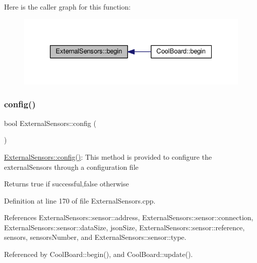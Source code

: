 Here is the caller graph for this function\+:\nopagebreak
\begin{figure}[H]
\begin{center}
\leavevmode
\includegraphics[width=326pt]{classExternalSensors_a58ede0d786a86417254708870f04a21e_icgraph}
\end{center}
\end{figure}
\mbox{\label{classExternalSensors_a862a4bd11346b37270d0244c2adabe5a}} 
\subsubsection{\texorpdfstring{config()}{config()}}
{\footnotesize\ttfamily bool External\+Sensors\+::config (\begin{DoxyParamCaption}{ }\end{DoxyParamCaption})}

\hyperlink{classExternalSensors_a862a4bd11346b37270d0244c2adabe5a}{External\+Sensors\+::config()}\+: This method is provided to configure the external\+Sensors through a configuration file

\begin{DoxyReturn}{Returns}
true if successful,false otherwise 
\end{DoxyReturn}


Definition at line 170 of file External\+Sensors.\+cpp.



References External\+Sensors\+::sensor\+::address, External\+Sensors\+::sensor\+::connection, External\+Sensors\+::sensor\+::data\+Size, json\+Size, External\+Sensors\+::sensor\+::reference, sensors, sensors\+Number, and External\+Sensors\+::sensor\+::type.



Referenced by Cool\+Board\+::begin(), and Cool\+Board\+::update().


